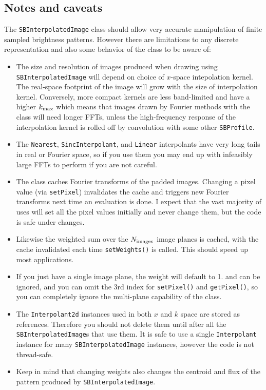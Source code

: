 \documentclass[11pt,preprint,flushrt]{aastex}
\begin{document}
\subsection{Notes and caveats}
The {\tt SBInterpolatedImage} class should allow very accurate manipulation of finite sampled brightness patterns.  However there are limitations to any discrete representation and also some behavior of the class to be aware of:
\begin{itemize}
\item The size and resolution of images produced when drawing using {\tt SBInterpolatedImage} will depend on choice of $x$-space intepolation kernel.   The real-space footprint of the image will grow with the size of interpolation kernel.  Conversely, more compact kernels are less band-limited and have a higher $k_{\rm max}$ which means that images drawn by Fourier methods with the class will need longer FFTs, unless the high-frequency response of the interpolation kernel is rolled off by convolution with some other {\tt SBProfile}.  
\item The {\tt Nearest},  {\tt SincInterpolant}, and {\tt Linear} interpolants have very long tails in real or Fourier space, so if you use them you may end up with infeasibly large FFTs to perform if you are not careful. 
\item The class caches Fourier transforms of the padded images.  Changing a pixel value (via {\tt setPixel}) invalidates the cache and triggers new Fourier transforms next time an evaluation is done.  I expect that the vast majority of uses will set all the pixel values initially and never change them, but the code is safe under changes.
\item Likewise the weighted sum over the $N_{\rm images}$ image planes is cached, with the cache invalidated each time {\tt setWeights()} is called.  This should speed up most applications.
\item If you just have a single image plane, the weight will default to 1. and can be ignored, and you can omit the 3rd index for {\tt setPixel()} and {\tt getPixel()}, so you can completely ignore the multi-plane capability of the class.
\item The {\tt Interpolant2d} instances used in both $x$ and $k$ space are stored as references.  Therefore you should not delete them until after all the {\tt SBInterpolatedImage}s that use them.  It is safe to use a single {\tt Interpolant} instance for many {\tt SBInterpolatedImage} instances, however the code is not thread-safe.
\item Keep in mind that changing weights also changes the centroid and flux of the pattern produced by {\tt SBInterpolatedImage}.
\end{itemize}
\end{document}
